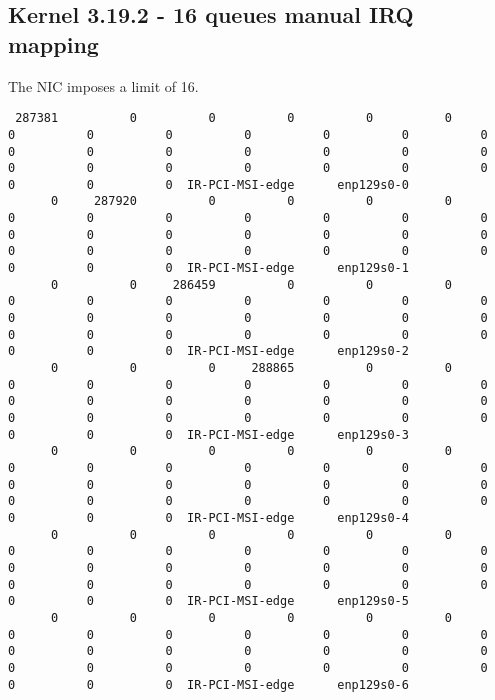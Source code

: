 
\subsection{Kernel 3.19.2 - 16 queues manual IRQ mapping}

The NIC imposes a limit of 16.

\begin{lstlisting}
 287381          0          0          0          0          0          0          0          0          0          0          0          0          0          0          0          0          0          0          0          0          0          0          0          0          0          0          0          0          0  IR-PCI-MSI-edge      enp129s0-0
      0     287920          0          0          0          0          0          0          0          0          0          0          0          0          0          0          0          0          0          0          0          0          0          0          0          0          0          0          0          0  IR-PCI-MSI-edge      enp129s0-1
      0          0     286459          0          0          0          0          0          0          0          0          0          0          0          0          0          0          0          0          0          0          0          0          0          0          0          0          0          0          0  IR-PCI-MSI-edge      enp129s0-2
      0          0          0     288865          0          0          0          0          0          0          0          0          0          0          0          0          0          0          0          0          0          0          0          0          0          0          0          0          0          0  IR-PCI-MSI-edge      enp129s0-3
      0          0          0          0          0          0          0          0          0          0          0          0          0          0          0          0          0          0          0          0          0          0          0          0          0          0          0          0          0          0  IR-PCI-MSI-edge      enp129s0-4
      0          0          0          0          0          0          0          0          0          0          0          0          0          0          0          0          0          0          0          0          0          0          0          0          0          0          0          0          0          0  IR-PCI-MSI-edge      enp129s0-5
      0          0          0          0          0          0          0          0          0          0          0          0          0          0          0          0          0          0          0          0          0          0          0          0          0          0          0          0          0          0  IR-PCI-MSI-edge      enp129s0-6

\end{lstlisting}
